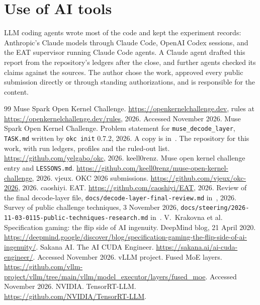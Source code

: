 \documentclass[11pt]{article}
\begin{document}
\section*{Use of AI tools}

LLM coding agents wrote most of the code and kept the experiment records:
Anthropic's Claude models through Claude Code, OpenAI Codex sessions, and the EAT
supervisor running Claude Code agents. A Claude agent drafted this report from the
repository's ledgers after the close, and further agents checked its claims
against the sources. The author chose the work, approved every public
submission directly or through standing authorizations, and is responsible for the
content.

\begin{thebibliography}{99}
 Muse Spark Open Kernel Challenge.
\url{https://openkernelchallenge.dev}, rules at
\url{https://openkernelchallenge.dev/rules}, 2026. Accessed November 2026.
 Muse Spark Open Kernel Challenge. Problem statement for
\texttt{muse\_decode\_layer}, \texttt{TASK.md} written by \texttt{okc init}
0.7.2, 2026. A copy is in~\cite{repo}.
 The repository for this work, with run ledgers, profiles and the
ruled-out list. \url{https://github.com/yelgabo/okc}, 2026.
 keell0renz. Muse open kernel challenge entry and
\texttt{LESSONS.md}. \url{https://github.com/keell0renz/muse-open-kernel-challenge}, 2026.
 vjeux. OKC 2026 submissions.
\url{https://github.com/vjeux/okc-2026}, 2026.
 caoshiyi. EAT. \url{https://github.com/caoshiyi/EAT}, 2026.
 Review of the final decode-layer file,
\texttt{docs/decode-layer-final-review.md} in~\cite{repo}, 2026.
 Survey of public challenge techniques, 3 November 2026,
\texttt{docs/steering/2026-11-03-0115-public-techniques-research.md} in~\cite{repo}.
 V.~Krakovna et al. Specification gaming: the flip side of AI
ingenuity. DeepMind blog, 21 April 2020.
\url{https://deepmind.google/discover/blog/specification-gaming-the-flip-side-of-ai-ingenuity/}.
 Sakana AI. The AI CUDA Engineer.
\url{https://sakana.ai/ai-cuda-engineer/}. Accessed November 2026.
 vLLM project. Fused MoE layers.
\url{https://github.com/vllm-project/vllm/tree/main/vllm/model_executor/layers/fused_moe}.
Accessed November 2026.
 NVIDIA. TensorRT-LLM. \url{https://github.com/NVIDIA/TensorRT-LLM}.

\end{thebibliography}
\end{document}
